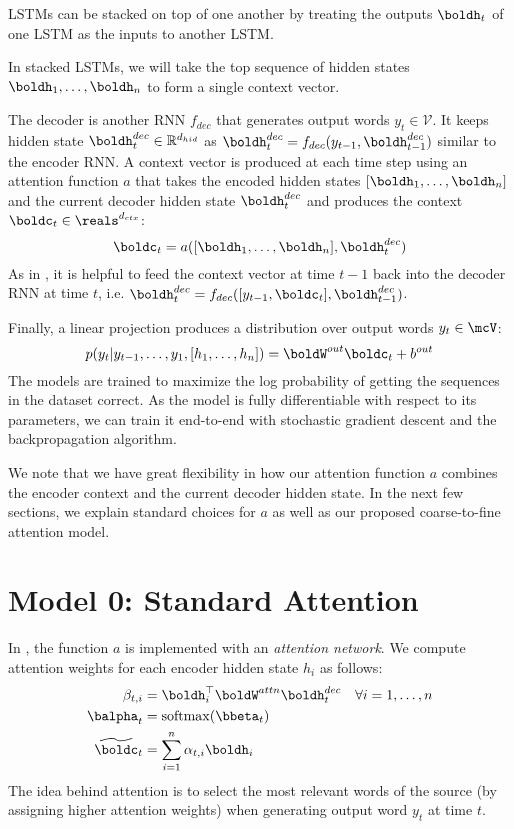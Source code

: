 \documentclass[11pt]{report}
\begin{document}
LSTMs can be stacked on top of one another by treating the outputs $\boldh_t$ of one LSTM as the inputs to another LSTM.

In stacked LSTMs, we will take the top sequence of hidden states $\boldh_1, \ldots, \boldh_n$ to form a single context vector.


The decoder is another RNN $f_{dec}$ that generates output words $y_t \in \mathcal{V}$. It keeps hidden state $\boldh_t^{dec} \in \mathbb{R}^{d_{hid}}$ as $\boldh_t^{dec} = f_{dec}(y_{t-1}, \boldh_{t-1}^{dec})$ similar to the encoder RNN.
A context vector is produced at each time step using an attention function $a$ that takes the encoded hidden states $[\boldh_1, \ldots, \boldh_n]$ and the current decoder hidden state $\boldh_t^{dec}$ and produces the context $\boldc_t \in \reals^{d_{ctx}}$:
\begin{equation}
\boldc_t = a([\boldh_1, \ldots, \boldh_n], \boldh_t^{dec})
\end{equation}
As in \citet{luong2015effective}, it is helpful to feed the context vector at time $t-1$ back into the decoder RNN at time $t$, i.e. $\boldh_t^{dec} = f_{dec}([y_{t-1}, \boldc_t], \boldh_{t-1}^{dec})$.

Finally, a linear projection produces a distribution over output words $y_t \in \mcV$:
\begin{equation}
p(y_t | y_{t-1}, \ldots, y_1, [h_1, \ldots, h_n]) = \boldW^{out}\boldc_t + b^{out}
\end{equation}
The models are trained to maximize the log probability of getting the sequences in the dataset correct. As the model is fully differentiable with respect to its parameters, we can train it end-to-end with stochastic gradient descent and the backpropagation algorithm.

We note that we have great flexibility in how our attention function $a$ combines the encoder context and the current decoder hidden state. In the next few sections, we explain standard choices for $a$ as well as our proposed coarse-to-fine attention model.

\section{Model 0: Standard Attention}

In \cite{bahdanau2014neural}, the function $a$ is implemented with an \emph{attention network}. We compute attention weights for each encoder hidden state $h_i$ as follows:
\begin{align}
\beta_{t,i} &= \boldh_i^\top \boldW^{attn} \boldh_t^{dec} \quad \forall i = 1, \ldots, n\\
\balpha_t &= \mathrm{softmax}(\bbeta_t) \\
\widetilde{\boldc}_t &= \sum_{i=1}^n \alpha_{t,i} \boldh_i
\end{align}
The idea behind attention is to select the most relevant words of the source (by assigning higher attention weights) when generating output word $y_t$ at time $t$.
\end{document}
